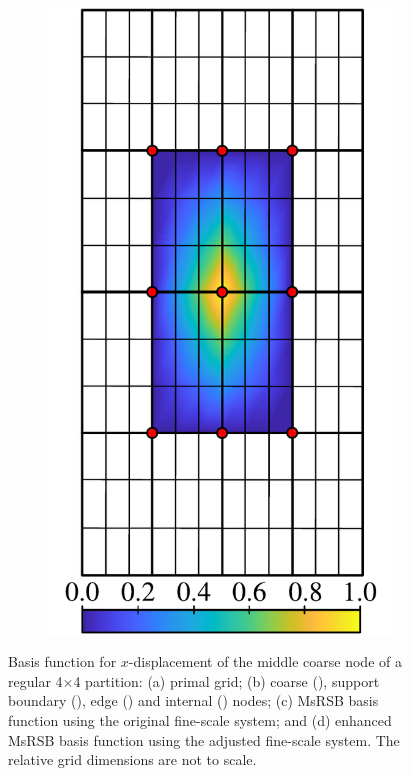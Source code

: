 \begin{figure} [htbp]
\begin{subfigure}[t]{0.22\textwidth}
  \centerline{\includegraphics[width=\linewidth]{figs/FE_12x12_d}}
  \caption{\label{fig:fem_demo_alter}}
\end{subfigure}
\caption[MsRSB basis functions for FEM linear elasticity]{\label{fig:fem_demo} Basis function for $x$-displacement of the middle coarse node of a regular 4$\times$4 partition: (a) primal grid; (b) coarse (), support boundary (), edge () and internal () nodes; (c) MsRSB basis function using the original fine-scale system; and (d) enhanced MsRSB basis function using the adjusted fine-scale system. The relative grid dimensions are not to scale.}
\end{figure}

